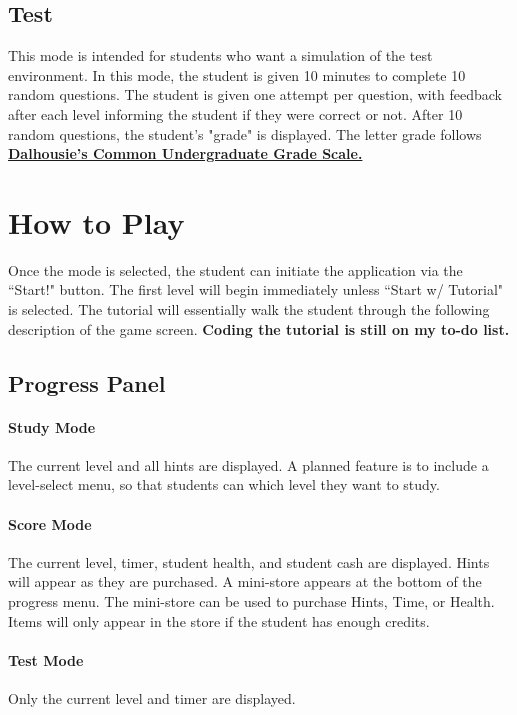 \documentclass[12pt]{article}
\let\oldhref\href
\renewcommand{\href}[2]{\oldhref{#1}{\bfseries#2}}
\begin{document}
\subsection{Test}
This mode is intended for students who want a simulation of the test environment. In this mode, the student is given 10 minutes to complete 10 random questions. The student is given one attempt per question, with feedback after each level informing the student if they were correct or not. After 10 random questions, the student's "grade" is displayed. The letter grade follows
\href{https://www.dal.ca/campus_life/academic-support/grades-and-student-records/grade-scale-and-definitions.html}{Dalhousie's Common Undergraduate Grade Scale.}\par


\section{How to Play}
Once the mode is selected, the student can initiate the application via the ``Start!" button. The first level will begin immediately unless ``Start w/ Tutorial" is selected. The tutorial will essentially walk the student through the following description of the game screen. \textbf{Coding the tutorial is still on my to-do list.}\par

\subsection{Progress Panel}
\paragraph{Study Mode}
The current level and all hints are displayed. A planned feature is to include a level-select menu, so that students can which level they want to study.\par

\paragraph{Score Mode}
The current level, timer, student health, and student cash are displayed. Hints will appear as they are purchased. A mini-store appears at the bottom of the progress menu. The mini-store can be used to purchase Hints, Time, or Health. Items will only appear in the store if the student has enough credits.\par

\paragraph{Test Mode}
Only the current level and timer are displayed.\par
\end{document}
